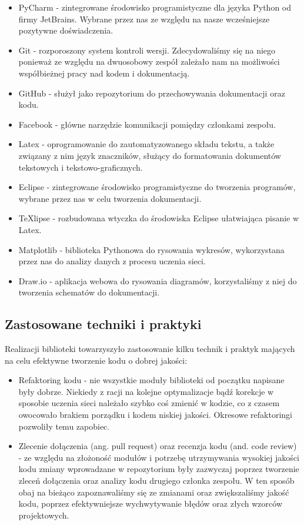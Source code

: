 \begin{itemize}
  \item PyCharm - zintegrowane środowisko programistyczne dla języka Python od firmy JetBrains.
  Wybrane przez nas ze względu na nasze wcześniejsze pozytywne doświadczenia.
  \item Git - rozporoszony system kontroli wersji. Zdecydowaliśmy się na niego ponieważ ze względu na 
  dwuosobowy zespół zależało nam na możliwości współbieżnej pracy nad kodem i dokumentacją.
  \item GitHub - służył jako repozytorium do przechowywania dokumentacji oraz kodu.
  \item Facebook - główne narzędzie komunikacji pomiędzy członkami zespołu.
  \item Latex - oprogramowanie do zautomatyzowanego składu tekstu, a także związany z nim język 
  znaczników, służący do formatowania dokumentów tekstowych i tekstowo-graficznych. 
  \item Eclipse - zintegrowane środowisko programistyczne do tworzenia programów, wybrane przez nas 
  w celu tworzenia dokumentacji.
  \item TeXlipse - rozbudowana wtyczka do środowiska Eclipse ułatwiająca pisanie w Latex.  
  \item Matplotlib - biblioteka Pythonowa do rysowania wykresów, wykorzystana przez nas do analizy danych 
  z procesu uczenia sieci. 
  \item Draw.io - aplikacja webowa do rysowania diagramów, korzystaliśmy z niej do tworzenia 
  schematów do dokumentacji.
\end{itemize}

\subsection{Zastosowane techniki i praktyki}
Realizacji biblioteki towarzyszyło zastosowanie kilku technik i praktyk mających na celu efektywne 
tworzenie kodu o dobrej jakości:
\begin{itemize}
  \item Refaktoring kodu - nie wszystkie moduły biblioteki od początku napisane były dobrze. Niekiedy z racji 
  na kolejne optymalizacje bądź korekcje w sposobie uczenia sieci należało szybko coś zmienić w kodzie,
  co z czasem owocowało brakiem porządku i kodem niskiej jakości. Okresowe refaktoringi pozwoliły temu zapobiec.
  \item Zlecenie dołączenia (ang. pull request) oraz recenzja kodu (and. code review) - ze względu na złożoność modułów i potrzebę utrzymywania wysokiej
  jakości kodu zmiany wprowadzane w repozytorium były zazwyczaj poprzez tworzenie zleceń dołączenia oraz analizy kodu
  drugiego członka zespołu. W ten sposób obaj na bieżąco zapoznawaliśmy się ze zmianami oraz zwiększaliśmy
  jakość kodu, poprzez efektywniejsze wychwytywanie błędów oraz złych wzorców projektowych.
\end{itemize}

